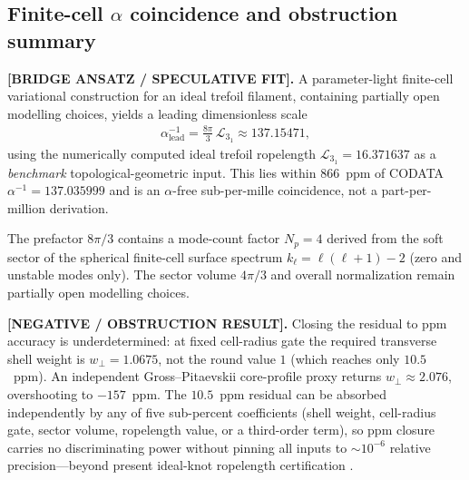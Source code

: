 \documentclass[11pt]{article}
\theoremstyle{definition}
\theoremstyle{plain}
\theoremstyle{remark}
\begin{document}
        \subsection{Finite-cell $\alpha$ coincidence and obstruction summary}
            \label{subsec:finite_cell_alpha_obstruction}

            \textbf{[BRIDGE ANSATZ / SPECULATIVE FIT].}
            A parameter-light finite-cell variational construction for an ideal trefoil filament,
            containing partially open modelling choices, yields a leading dimensionless scale
            \begin{align}
                \alpha^{-1}_{\mathrm{lead}}
                =
                \frac{8\pi}{3}\,\mathcal{L}_{3_1}
                \approx 137.15471,
                \label{eq:alpha_lead_finite_cell}
            \end{align}
            using the numerically computed ideal trefoil ropelength
            $\mathcal{L}_{3_1}=16.371637$ \cite{AshtonCantarellaPiatekRawdon2011}
            as a \emph{benchmark} topological-geometric input.
            This lies within $866$~ppm of CODATA $\alpha^{-1}=137.035999$ and is an
            $\alpha$-free sub-per-mille coincidence, not a part-per-million derivation.

            The prefactor $8\pi/3$ contains a mode-count factor $N_p=4$ derived from the
            soft sector of the spherical finite-cell surface spectrum
            $k_\ell=\ell(\ell+1)-2$ (zero and unstable modes only). The sector volume
            $4\pi/3$ and overall normalization remain partially open modelling choices.

            \textbf{[NEGATIVE / OBSTRUCTION RESULT].}
            Closing the residual to ppm accuracy is underdetermined: at fixed cell-radius
            gate the required transverse shell weight is $w_\perp=1.0675$, not the round
            value $1$ (which reaches only $10.5$~ppm). An independent Gross--Pitaevskii
            core-profile proxy returns $w_\perp\approx 2.076$, overshooting to $-157$~ppm.
            The $10.5$~ppm residual can be absorbed independently by any of five
            sub-percent coefficients (shell weight, cell-radius gate, sector volume,
            ropelength value, or a third-order term), so ppm closure carries no
            discriminating power without pinning all inputs to $\sim10^{-6}$ relative
            precision---beyond present ideal-knot ropelength certification
            \cite{AshtonCantarellaPiatekRawdon2011,CantarellaKusnerSullivan2002}.
\end{document}

